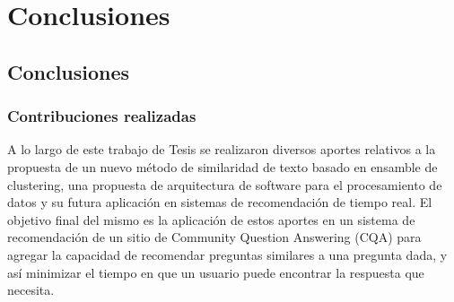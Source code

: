 \chapter*{Conclusiones}\label{ch:conclusiones}

\section{Conclusiones}
\subsection{Contribuciones realizadas}
A lo largo de este trabajo de Tesis se realizaron diversos aportes relativos a la propuesta de un nuevo método de similaridad de texto basado en ensamble de clustering, una propuesta de arquitectura de software para el procesamiento de datos y su futura aplicación en sistemas de recomendación de tiempo real. El objetivo final del mismo es la aplicación de estos aportes en un sistema de recomendación de un sitio de Community Question Answering (CQA) para agregar la capacidad de recomendar preguntas similares a una pregunta dada, y así minimizar el tiempo en que un usuario puede encontrar la respuesta que necesita.

